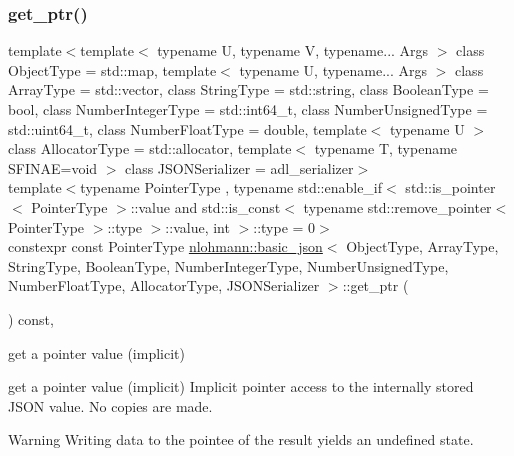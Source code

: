 \subsubsection{\texorpdfstring{get\+\_\+ptr()}{get\_ptr()}\hspace{0.1cm}{\footnotesize\ttfamily [2/2]}}
{\footnotesize\ttfamily template$<$template$<$ typename U, typename V, typename... Args $>$ class Object\+Type = std\+::map, template$<$ typename U, typename... Args $>$ class Array\+Type = std\+::vector, class String\+Type  = std\+::string, class Boolean\+Type  = bool, class Number\+Integer\+Type  = std\+::int64\+\_\+t, class Number\+Unsigned\+Type  = std\+::uint64\+\_\+t, class Number\+Float\+Type  = double, template$<$ typename U $>$ class Allocator\+Type = std\+::allocator, template$<$ typename T, typename S\+F\+I\+N\+A\+E=void $>$ class J\+S\+O\+N\+Serializer = adl\+\_\+serializer$>$ \\
template$<$typename Pointer\+Type , typename std\+::enable\+\_\+if$<$ std\+::is\+\_\+pointer$<$ Pointer\+Type $>$\+::value and std\+::is\+\_\+const$<$ typename std\+::remove\+\_\+pointer$<$ Pointer\+Type $>$\+::type $>$\+::value, int $>$\+::type  = 0$>$ \\
constexpr const Pointer\+Type \mbox{\hyperlink{classnlohmann_1_1basic__json}{nlohmann\+::basic\+\_\+json}}$<$ Object\+Type, Array\+Type, String\+Type, Boolean\+Type, Number\+Integer\+Type, Number\+Unsigned\+Type, Number\+Float\+Type, Allocator\+Type, J\+S\+O\+N\+Serializer $>$\+::get\+\_\+ptr (\begin{DoxyParamCaption}{ }\end{DoxyParamCaption}) const\hspace{0.3cm}{\ttfamily [inline]}, {\ttfamily [noexcept]}}



get a pointer value (implicit) 

get a pointer value (implicit) Implicit pointer access to the internally stored J\+S\+ON value. No copies are made.

\begin{DoxyWarning}{Warning}
Writing data to the pointee of the result yields an undefined state.
\end{DoxyWarning}

